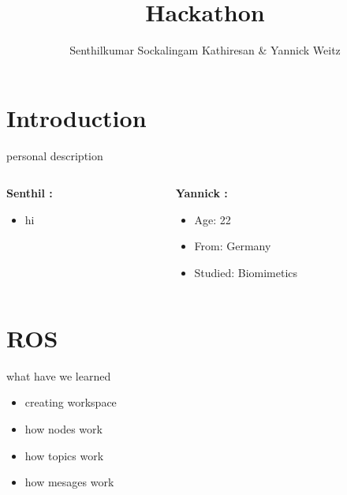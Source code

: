 \documentclass[xcolor=dvipsnames]{beamer}
\title{Hackathon}
\author{Senthilkumar Sockalingam Kathiresan \& Yannick Weitz}
\begin{document}
\begin{frame}
\titlepage
\end{frame}

\begin{frame}
\tableofcontents[section]
\end{frame}

\section{Introduction}


\begin{frame}{personal description}
\begin{columns}

\begin{column}[b]{0.5\textwidth}
\begin{center}
\textbf{Senthil :}

\begin{itemize}
\item hi
\end{itemize}

\end{center}
\end{column}
\begin{column}[b]{0.5\textwidth}  %
\begin{center}
\textbf{Yannick :}

\begin{itemize}
\item Age: 22
\medskip
\item From: Germany
\medskip
\item Studied: Biomimetics
\end{itemize}

\end{center}
\end{column}
\end{columns}

\end{frame}
\section{ROS}

\begin{frame}{what have we learned}
\begin{itemize}
\item<1-> creating workspace
\item<2-> how nodes work
\item<3-> how topics work
\item<4-> how mesages work
\end{itemize}
\end{frame}
\end{document}
